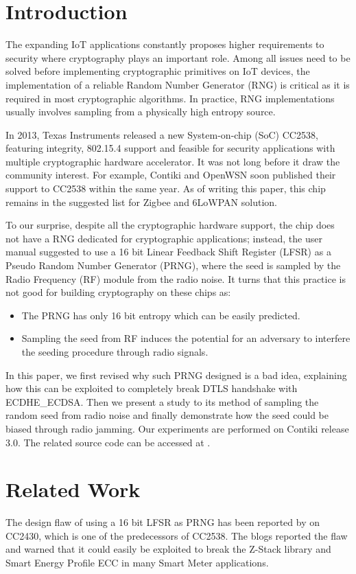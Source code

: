 \section{Introduction}
The expanding IoT applications constantly proposes higher requirements to security where cryptography plays an important role. Among all issues need to be solved before implementing cryptographic primitives on IoT devices, the implementation of a reliable Random Number Generator (RNG) is critical as it is required in most cryptographic algorithms. In practice, RNG implementations usually involves sampling from a physically high entropy source.

In 2013, Texas Instruments released a new System-on-chip (SoC)  CC2538\cite{CC2538}, featuring integrity, 802.15.4 support and feasible for security applications with multiple cryptographic hardware accelerator. It was not long before it draw the community interest. For example, Contiki and OpenWSN soon published their support to CC2538 within the same year. As of writing this paper, this chip remains in the suggested list for Zigbee and 6LoWPAN solution.

To our surprise, despite all the cryptographic hardware support, the chip does not have a RNG dedicated for cryptographic applications; instead, the user manual suggested to use a 16 bit Linear Feedback Shift Register (LFSR) as a Pseudo Random Number Generator (PRNG), where the seed is sampled by the Radio Frequency (RF) module from the radio noise. It turns that this practice is not good for building cryptography on these chips as:
\begin{itemize}
	\item The PRNG has only 16 bit entropy which can be easily predicted.
	\item Sampling the seed from RF induces the potential for an adversary to interfere the seeding procedure through radio signals.
\end{itemize}

In this paper, we first revised why such PRNG designed is a bad idea, explaining how this can be exploited to completely break DTLS handshake with ECDHE\_ECDSA. Then we present a study to its method of sampling the random seed from radio noise and finally demonstrate how the seed could be biased through radio jamming. Our experiments are performed on Contiki release 3.0. The related source code can be accessed at \cite{prngtest}.

\section{Related Work}
The design flaw of using a 16 bit LFSR as PRNG has been reported by \cite{SmartMeterBlog}\cite{CC2530PRNG} on CC2430, which is one of the predecessors of CC2538. The blogs reported the flaw and warned that it could easily be exploited to break the Z-Stack library\cite{ZStack} and Smart Energy Profile ECC in many Smart Meter applications.

